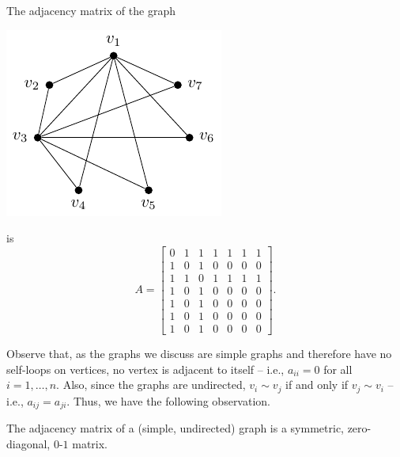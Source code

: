 \begin{Example}\label{ex:GNM(6-11)AdjMat}
The adjacency matrix of the graph
\begin{center}
\includegraphics{Images/GNM(6,11).pdf}
\end{center}
is
\begin{equation*}
A = \begin{bmatrix}
0 & 1 & 1 & 1 & 1 & 1 & 1 \\
1 & 0 & 1 & 0 & 0 & 0 & 0 \\
1 & 1 & 0 & 1 & 1 & 1 & 1 \\
1 & 0 & 1 & 0 & 0 & 0 & 0 \\
1 & 0 & 1 & 0 & 0 & 0 & 0 \\
1 & 0 & 1 & 0 & 0 & 0 & 0 \\
1 & 0 & 1 & 0 & 0 & 0 & 0
\end{bmatrix}.
\end{equation*}
\end{Example}

Observe that, as the graphs we discuss are simple graphs and therefore have no self-loops on vertices, no vertex is adjacent to itself -- i.e., $a_{ii} = 0$ for all $i = 1, \ldots, n$. Also, since the graphs are undirected, $v_i \sim v_j$ if and only if $v_j \sim v_i$ -- i.e., $a_{ij} = a_{ji}$. Thus, we have the following observation.

\begin{Observation}
The adjacency matrix of a (simple, undirected) graph is a symmetric, zero-diagonal, $0$-$1$ matrix.
\end{Observation}

